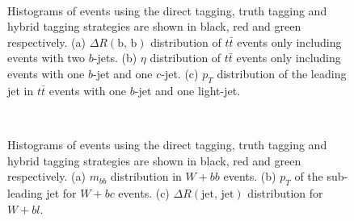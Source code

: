 \begin{figure}[ht]
  \centering
  \\
  \caption[A comparison of tagging strategies in $t\bar{t}$ events.]{Histograms of
    events using the direct tagging, truth tagging and hybrid tagging strategies
    are shown in black, red and green respectively. (a) $ \Delta R(\text{b, b})$
    distribution of $t\bar{t}$ events only including events with two $b$-jets. (b)
    $\eta$ distribution of $t\bar{t}$ events only including events with one
    $b$-jet and one $c$-jet. (c) $p_T$ distribution of the leading jet in
    $t\bar{t}$ events with one $b$-jet and one light-jet.}
  \label{fig:truth_tag_validation_tt}
\end{figure}
\begin{figure}[ht]
  \centering
  \\
  \caption[A comparison of tagging strategie in W + jets events.]{Histograms of
    events using the direct tagging, truth tagging and hybrid tagging strategies
    are shown in black, red and green respectively. (a) $m_{bb}$ distribution in
    $W + bb$ events. (b) $p_T$ of the sub-leading jet for $W + bc$ events. (c)
    $\Delta R(\text{jet, jet})$ distribution for $W + bl$.}
  \label{fig:truth_tag_validation_wjets}
\end{figure}